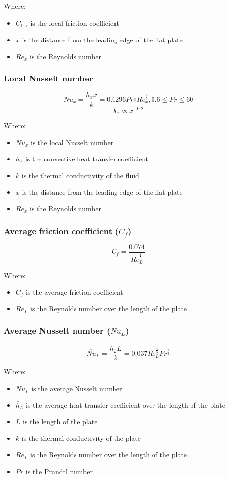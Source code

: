\documentclass[11pt]{article}
\begin{document}
Where:
\begin{itemize}
\item \(C_{\text{f, x}}\) is the local friction coefficient
\item \(x\) is the distance from the leading edge of the flat plate
\item \(Re_x\) is the Reynolds number
\end{itemize}
\subsubsection{Local Nusselt number}
\label{sec:org51df493}
\[Nu_x = \frac{h_x x}{k} = 0.0296 Pr^{\frac{1}{3}} Re_x^{\frac{4}{5}}, 0.6 \le Pr \le 60\]
\[h_x \propto x^{-0.2}\]

Where:
\begin{itemize}
\item \(Nu_x\) is the local Nusselt number
\item \(h_x\) is the convective heat transfer coefficient
\item \(k\) is the thermal conductivity of the fluid
\item \(x\) is the distance from the leading edge of the flat plate
\item \(Re_x\) is the Reynolds number
\end{itemize}
\subsubsection{Average friction coefficient (\(C_f\))}
\label{sec:orgb8e5057}
\[C_f = \frac{0.074}{Re_L^{\frac{1}{5}}}\]

Where:
\begin{itemize}
\item \(C_f\) is the average friction coefficient
\item \(Re_L\) is the Reynolds number over the length of the plate
\end{itemize}
\subsubsection{Average Nusselt number (\(\overline{Nu}_L\))}
\label{sec:orgec1f802}
\[\overline{Nu}_L = \frac{\bar{h}_L L}{k} = 0.037 Re_L^{\frac{4}{5}} Pr^{\frac{1}{3}}\]

Where:
\begin{itemize}
\item \(\overline{Nu}_L\) is the average Nusselt number
\item \(\bar{h}_L\) is the average heat transfer coefficient over the length of the plate
\item \(L\) is the length of the plate
\item \(k\) is the thermal conductivity of the plate
\item \(Re_L\) is the Reynolds number over the length of the plate
\item \(Pr\) is the Prandtl number
\end{itemize}
\end{document}
